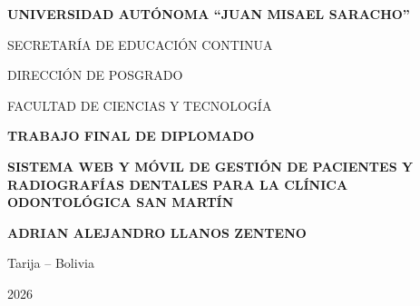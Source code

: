 	
	
	\begin{titlepage}
		
		\begin{center}
			
			{\large\bfseries
				UNIVERSIDAD AUTÓNOMA ``JUAN MISAEL SARACHO''
			}
			
			\vspace{0.3cm}
			
			{\large
				SECRETARÍA DE EDUCACIÓN CONTINUA
			}
			
			\vspace{0.2cm}
			
			{\large
				DIRECCIÓN DE POSGRADO
			}
			
			\vspace{0.2cm}
			
			{\large
				FACULTAD DE CIENCIAS Y TECNOLOGÍA
			}
			
			\vspace{1.5cm}
			
			{\Large\bfseries
				TRABAJO FINAL DE DIPLOMADO
			}
			
			\vspace{1.2cm}
			
			{\large\bfseries
				SISTEMA WEB Y MÓVIL DE GESTIÓN DE PACIENTES Y RADIOGRAFÍAS DENTALES
PARA LA CLÍNICA
				ODONTOLÓGICA SAN MARTÍN
			}
			
			\vspace{1.2cm}
			
			{\large\bfseries
				ADRIAN ALEJANDRO LLANOS ZENTENO
			}
			
			\vfill
			
			Tarija -- Bolivia
			
			2026
			
		\end{center}
		
	\end{titlepage}
	
	
	
	\clearpage
	\setcounter{page}{1}
	
	
	

